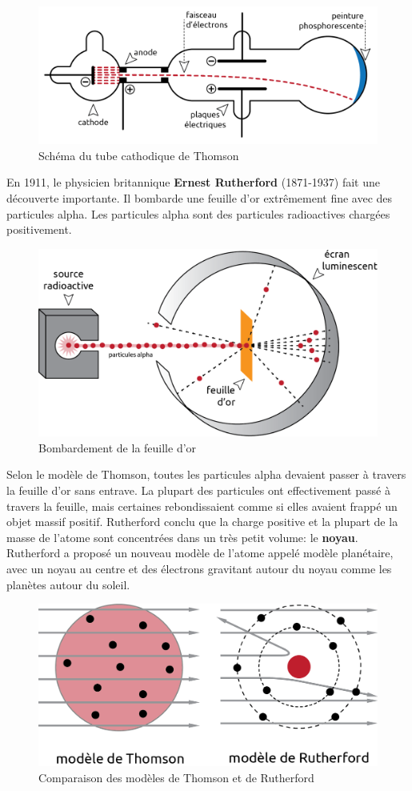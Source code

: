 \documentclass[
  11pt,
  a4paper,
  openany]{book}
\begin{document}
\begin{figure}

{\centering \includegraphics[width=0.4\linewidth]{images/exp-thomson} 

}

\caption{Schéma du tube cathodique de Thomson}\label{fig:exp-thomson}
\end{figure}

En 1911, le physicien britannique \textbf{Ernest Rutherford} (1871-1937) fait une découverte importante. Il bombarde une feuille d'or extrêmement fine avec des particules alpha. Les particules alpha sont des particules radioactives chargées positivement.

\begin{figure}

{\centering \includegraphics[width=0.4\linewidth]{images/exp-rutherford} 

}

\caption{Bombardement de la feuille d'or}\label{fig:exp-rutherford}
\end{figure}

Selon le modèle de Thomson, toutes les particules alpha devaient passer à travers la feuille d'or sans entrave. La plupart des particules ont effectivement passé à travers la feuille, mais certaines rebondissaient comme si elles avaient frappé un objet massif positif. Rutherford conclu que la charge positive et la plupart de la masse de l'atome sont concentrées dans un très petit volume: le \textbf{noyau}. Rutherford a proposé un nouveau modèle de l'atome appelé modèle planétaire, avec un noyau au centre et des électrons gravitant autour du noyau comme les planètes autour du soleil.

\begin{figure}

{\centering \includegraphics[width=0.4\linewidth]{images/exp-thomson-rutherford} 

}

\caption{Comparaison des modèles de Thomson et de Rutherford}\label{fig:exp-thomson-rutherford}
\end{figure}
\end{document}
